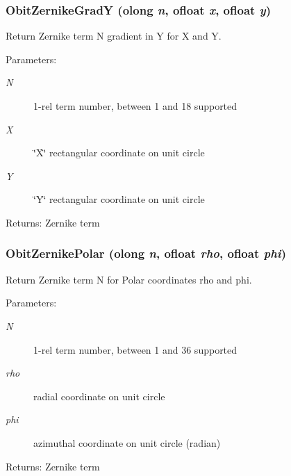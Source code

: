 \subsubsection{ Obit\-Zernike\-Grad\-Y ({\bf olong} {\em n}, {\bf ofloat} {\em x}, {\bf ofloat} {\em y})}\label{ObitZernike_8h_a2}


Return Zernike term N gradient in Y for X and Y. 

\begin{Desc}
\item[Parameters:]
\begin{description}
\item[{\em N}]1-rel term number, between 1 and 18 supported \item[{\em X}]\char`\"{}X\char`\"{} rectangular coordinate on unit circle \item[{\em Y}]\char`\"{}Y\char`\"{} rectangular coordinate on unit circle \end{description}
\end{Desc}
\begin{Desc}
\item[Returns:]Zernike term \end{Desc}
\subsubsection{ Obit\-Zernike\-Polar ({\bf olong} {\em n}, {\bf ofloat} {\em rho}, {\bf ofloat} {\em phi})}\label{ObitZernike_8h_a3}


Return Zernike term N for Polar coordinates rho and phi. 

\begin{Desc}
\item[Parameters:]
\begin{description}
\item[{\em N}]1-rel term number, between 1 and 36 supported \item[{\em rho}]radial coordinate on unit circle \item[{\em phi}]azimuthal coordinate on unit circle (radian) \end{description}
\end{Desc}
\begin{Desc}
\item[Returns:]Zernike term \end{Desc}
